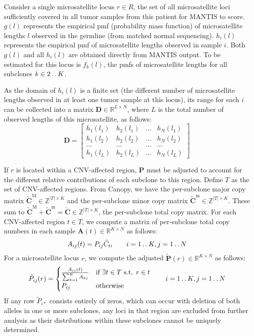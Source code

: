 Consider a single microsatellite locus $r \in R$, the set of all microsatellite loci sufficiently covered in all tumor samples from this patient for MANTIS to score. $g(l)$ represents the empirical pmf (probability mass function) of microsatellite lengths $l$ observed in the germline (from matched normal sequencing). $h_i(l)$ represents the empirical pmf of microsatellite lengths observed in sample $i$. Both $g(l)$ and all $h_i(l)$ are obtained directly from MANTIS output. To be estimated for this locus is $f_k(l)$, the pmfs of microsatellite lengths for all subclones $k \in 2 \mathinner {\ldotp \ldotp} K$.

As the domain of $h_i(l)$ is a finite set (the different number of microsatellite lengths observed in at least one tumor sample at this locus), its range for each $i$ can be collected into a matrix $\mathbf{D} \in \mathbb{R}^{L \times N}$, where $L$ is the total number of observed lengths of this microsatellite, as follows:
\[
	\mathbf{D} = 
	\begin{bmatrix}
	h_1(l_1) & h_2(l_1) & \dots & h_N(l_1)\\
	h_1(l_2) & h_2(l_2) & \dots & h_N(l_2)\\
	\dots    & \dots    & \dots & \dots   \\
	h_1(l_L) & h_2(l_L) & \dots & h_N(l_L)
	\end{bmatrix}
\]

If $r$ is located within a CNV-affected region, $\mathbf{P}$ must be adjusted to account for the different relative contributions of each subclone to this region. Define $T$ as the set of CNV-affected regions. From Canopy, we have the per-subclone major copy matrix $\mathbf{\tilde{C}}^\text{M} \in \mathbb{Z}^{|T| \times K}$ and the per-subclone minor copy matrix $\mathbf{\tilde{C}}^\text{m} \in \mathbb{Z}^{|T| \times K}$. These sum to $\mathbf{\tilde{C}}^\text{M} + \mathbf{\tilde{C}}^\text{m} = \mathbf{\tilde{C}} \in \mathbb{Z}^{|T| \times K}$, the per-subclone total copy matrix. For each CNV-affected region $t \in T$, we compute a matrix of per-subclone total copy numbers in each sample $\mathbf{A}(t) \in \mathbb{R}^{K \times N}$ as follows:
\begin{equation}
	A_{ij}(t) = P_{ij} \tilde{C}_{ti} \qquad i = 1 \mathinner {\ldotp \ldotp} K, j = 1 \mathinner {\ldotp \ldotp} N
\end{equation}
For a microsatellite locus $r$, we compute the adjusted $\mathbf{\tilde{P}}(r) \in \mathbb{R}^{K \times N}$ as follows:
\begin{equation}
	\tilde{P}_{ij}(r) = \begin{cases}
		\frac{A_{ij}(t)}{\sum_{k=1}^{K}A_{kj}} & \text{if } \exists t \in T \text{ s.t. } r \in t \\
		P_{ij} & \text{otherwise}
	\end{cases} \qquad i = 1 \mathinner {\ldotp \ldotp} K, j = 1 \mathinner {\ldotp \ldotp} N
\end{equation}
If any row $\tilde{P}_{i*}$ consists entirely of zeros, which can occur with deletion of both alleles in one or more subclones, any loci in that region are excluded from further analysis as their distributions within these subclones cannot be uniquely determined.

